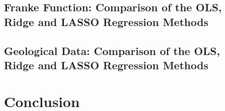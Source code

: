 \documentclass[]{article}
\begin{document}
\subsection{Franke Function: Comparison of the OLS, Ridge and LASSO Regression Methods}


\subsection{Geological Data: Comparison of the OLS, Ridge and LASSO Regression Methods}



\section{Conclusion}





\end{document}
